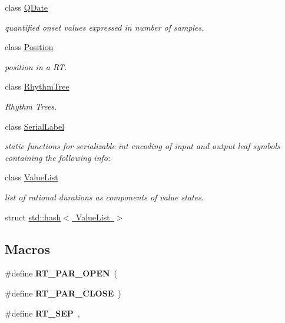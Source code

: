\begin{DoxyCompactItemize}
class \mbox{\hyperlink{classQDate}{Q\+Date}}
\begin{DoxyCompactList}\small\item\em quantified onset values expressed in number of samples. \end{DoxyCompactList}\item 
class \mbox{\hyperlink{classPosition}{Position}}
\begin{DoxyCompactList}\small\item\em position in a RT. \end{DoxyCompactList}\item 
class \mbox{\hyperlink{classRhythmTree}{Rhythm\+Tree}}
\begin{DoxyCompactList}\small\item\em Rhythm Trees. \end{DoxyCompactList}\item 
class \mbox{\hyperlink{classSerialLabel}{Serial\+Label}}
\begin{DoxyCompactList}\small\item\em static functions for serializable int encoding of input and output leaf symbols containing the following info\+: \end{DoxyCompactList}\item 
class \mbox{\hyperlink{classValueList}{Value\+List}}
\begin{DoxyCompactList}\small\item\em list of rational durations as components of value states. \end{DoxyCompactList}\item 
struct \mbox{\hyperlink{structstd_1_1hash_3_01ValueList_01_4}{std\+::hash$<$ Value\+List $>$}}
\end{DoxyCompactItemize}
\subsection*{Macros}
\begin{DoxyCompactItemize}
\item 
\mbox{\label{group__output_gae303eba6aa9e3b8613a5795c73e4fbea}} 
\#define {\bfseries R\+T\+\_\+\+P\+A\+R\+\_\+\+O\+P\+EN}~\textquotesingle{}(\textquotesingle{}
\item 
\mbox{\label{group__output_gae92f0807f278bf37adf40090ad2dc4be}} 
\#define {\bfseries R\+T\+\_\+\+P\+A\+R\+\_\+\+C\+L\+O\+SE}~\textquotesingle{})\textquotesingle{}
\item 
\mbox{\label{group__output_ga503dde6f933b959604bbeb17820933d5}} 
\#define {\bfseries R\+T\+\_\+\+S\+EP}~\textquotesingle{},\textquotesingle{}
\end{DoxyCompactItemize}
